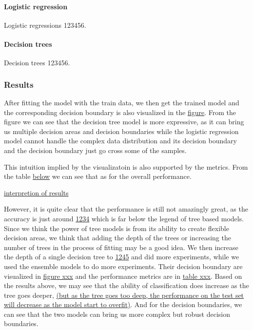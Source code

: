 \documentclass{article}
\begin{document}
\paragraph{Logistic regression} Logistic regressions 123456.

\paragraph{Decision trees} Decision trees 123456.

\subsubsection*{Results}

After fitting the model with the train data, we then get the trained model and the corresponding decision boundary is also visualized in the \underline{figure}. From the figure we can see that the decision tree model is more expressive, as it can bring us multiple decision areas and decision boundaries while the logistic regression model cannot handle the complex data distribution and its decision boundary and the decision boundary just go cross some of the samples. 

This intuition implied by the visualizatoin is also supported by the metrics. From the table \underline{below} we can see that as for the overall performance. 

\underline{interpretion of results}

However, it is quite clear that the performance is still not amazingly great, as the accuracy is just around \underline{1234} which is far below the legend of tree based models. Since we think the power of tree models is from its ability to create flexible decision areas, we think that adding the depth of the trees or increasing the number of trees in the process of fitting may be a good idea. We then increase the depth of a single decision tree to \underline{1245} and did more experiments,
while we used the ensemble models to do more experiments. Their decision boundary are visualized in \underline{figure xxx} and the performance metrics are in \underline{table xxx}. Based on the results above, we may see that the ability of classification does increase as the tree goes deeper, 
\underline{(but as the tree goes too deep, the performance on the test set will decrease as the model start to overfit)}. 
And for the decision boundaries, we can see that the two models can bring us more complex but robust decision boundaries.
\end{document}
